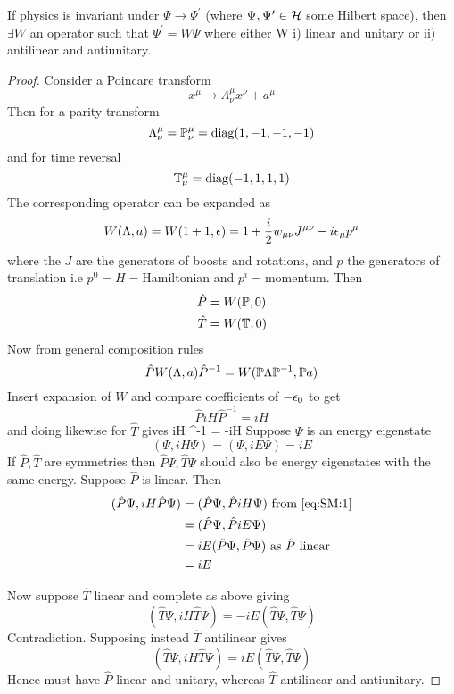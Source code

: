 \documentclass{article}
\begin{document}
\begin{theorem}[Winger]
If physics is invariant under $\Psi \to \Psi^\prime$ (where $\Psi, \Psi^\prime \in \mathcal{H}$ some Hilbert space), then $\exists W$ an operator such that $\Psi^\prime = W\Psi$ where either W i) linear and unitary or ii) antilinear and antiunitary. 
\end{theorem}
\begin{proof}
Consider a Poincare transform 
\[
x^\mu \to \Lambda^\mu_\nu x^\nu + a^\mu
\]
Then for a parity transform 
\[
\Lambda^\mu_\nu = \mathbb{P}^\mu_\nu = \operatorname{diag}(1,-1,-1,-1)
\]
and for time reversal
\[
\mathbb{T}^\mu_\nu = \operatorname{diag}(-1,1,1,1)
\]
The corresponding operator can be expanded as 
\[
W(\Lambda,a) = W(1+1,\epsilon) = 1+\frac{i}{2} w_{\mu\nu} J^{\mu\nu} - i\epsilon_\mu p^\mu
\]
where the $J$ are the generators of boosts and rotations, and $p$ the generators of translation i.e $p^0=H=$Hamiltonian and $p^i=$momentum. Then
\begin{align*}
    \hat{P} &= W(\mathbb{P},0) \\
    \hat{T} &= W(\mathbb{T},0)
\end{align*}
Now from general composition rules 
\[
\hat{P} W(\Lambda,a) \hat{P}^{-1} = W(\mathbb{P}\Lambda\mathbb{P}^{-1},\mathbb{P}a)
\]
Insert expansion of $W$ and compare coefficients of $-\epsilon_0$ to get 
\[
\hat{P} iH \hat{P}^{-1} = iH
\]
and doing likewise for $\hat{T}$ gives 
\be
{} iH ^{-1} = -iH \label{eq:SM:1}
\ee
Suppose $\Psi$ is an energy eigenstate
\[
(\Psi, iH\Psi) = (\Psi, iE\Psi) = iE
\]
If $\hat{P},\hat{T}$ are symmetries then $\hat{P}\Psi,\hat{T}\Psi$ should also be energy eigenstates with the same energy. 
Suppose $\hat{P}$ is linear. Then
\begin{align*}
(\hat{P}\Psi,iH\hat{P}\Psi) &= (\hat{P}\Psi,\hat{P} iH\Psi) \text{ from \ref{eq:SM:1}} \\ 
&= (\hat{P}\Psi,\hat{P} iE\Psi) \\
&= iE(\hat{P}\Psi,\hat{P}\Psi) \text{ as $\hat{P}$ linear} \\
&= iE 
\end{align*}

Now suppose $\hat{T}$ linear and complete as above giving
\[
(\hat{T}\Psi,iH\hat{T }\Psi) = -iE(\hat{T}\Psi,\hat{T}\Psi)
\]
Contradiction. 
Supposing instead $\hat{T}$ antilinear gives 
\[
(\hat{T}\Psi,iH\hat{T }\Psi) = iE(\hat{T}\Psi,\hat{T}\Psi)
\]
Hence must have $\hat{P}$ linear and unitary, whereas $\hat{T}$ antilinear and antiunitary. 
\end{proof}

\end{document}
